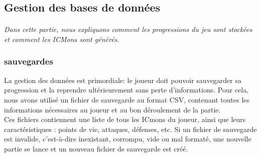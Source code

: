 \documentclass[12pt,a4paper, twoside]{article}
\begin{document}
\subsection{Gestion des bases de données}
\paragraph{} \emph{Dans cette partie, nous expliquons comment les progressions du jeu sont stockées et comment les ICMons sont générés.}
    \subsubsection{sauvegardes}
     La gestion des données est primordiale: le joueur doit pouvoir sauvegarder sa progression et la reprendre ultérieurement sans perte d'informations.
     Pour cela, nous avons utilisé un fichier de sauvegarde au format CSV, contenant toutes les informations nécessaires au joueur et au bon déroulement de la partie.\\
     Ces fichiers contiennent une liste de tous les ICmons du joueur, ainsi que leurs caractéristiques : points de vie, attaques, défenses, etc.
     Si un fichier de sauvegarde est invalide, c'est-à-dire inexistant, corrompu, vide ou mal formaté, une nouvelle partie se lance et un nouveau fichier de sauvegarde est créé.\\
\end{document}

